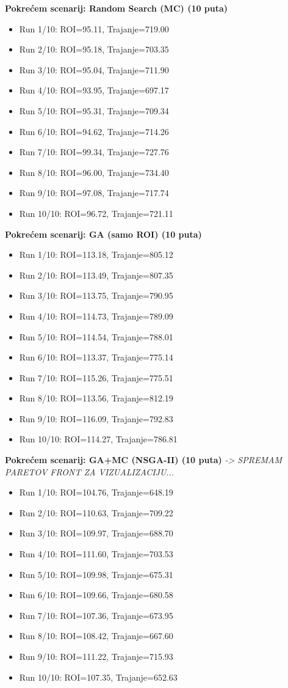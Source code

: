 \textbf{Pokrećem scenarij: Random Search (MC) (10 puta)}
\begin{itemize}
    \item Run 1/10: ROI=95.11, Trajanje=719.00
    \item Run 2/10: ROI=95.18, Trajanje=703.35
    \item Run 3/10: ROI=95.04, Trajanje=711.90
    \item Run 4/10: ROI=93.95, Trajanje=697.17
    \item Run 5/10: ROI=95.31, Trajanje=709.34
    \item Run 6/10: ROI=94.62, Trajanje=714.26
    \item Run 7/10: ROI=99.34, Trajanje=727.76
    \item Run 8/10: ROI=96.00, Trajanje=734.40
    \item Run 9/10: ROI=97.08, Trajanje=717.74
    \item Run 10/10: ROI=96.72, Trajanje=721.11
\end{itemize}

\textbf{Pokrećem scenarij: GA (samo ROI) (10 puta)}
\begin{itemize}
    \item Run 1/10: ROI=113.18, Trajanje=805.12
    \item Run 2/10: ROI=113.49, Trajanje=807.35
    \item Run 3/10: ROI=113.75, Trajanje=790.95
    \item Run 4/10: ROI=114.73, Trajanje=789.09
    \item Run 5/10: ROI=114.54, Trajanje=788.01
    \item Run 6/10: ROI=113.37, Trajanje=775.14
    \item Run 7/10: ROI=115.26, Trajanje=775.51
    \item Run 8/10: ROI=113.56, Trajanje=812.19
    \item Run 9/10: ROI=116.09, Trajanje=792.83
    \item Run 10/10: ROI=114.27, Trajanje=786.81
\end{itemize}

\textbf{Pokrećem scenarij: GA+MC (NSGA-II) (10 puta)}
\textit{-> SPREMAM PARETOV FRONT ZA VIZUALIZACIJU...}
\begin{itemize}
    \item Run 1/10: ROI=104.76, Trajanje=648.19
    \item Run 2/10: ROI=110.63, Trajanje=709.22
    \item Run 3/10: ROI=109.97, Trajanje=688.70
    \item Run 4/10: ROI=111.60, Trajanje=703.53
    \item Run 5/10: ROI=109.98, Trajanje=675.31
    \item Run 6/10: ROI=109.66, Trajanje=680.58
    \item Run 7/10: ROI=107.36, Trajanje=673.95
    \item Run 8/10: ROI=108.42, Trajanje=667.60
    \item Run 9/10: ROI=111.22, Trajanje=715.93
    \item Run 10/10: ROI=107.35, Trajanje=652.63
\end{itemize}

